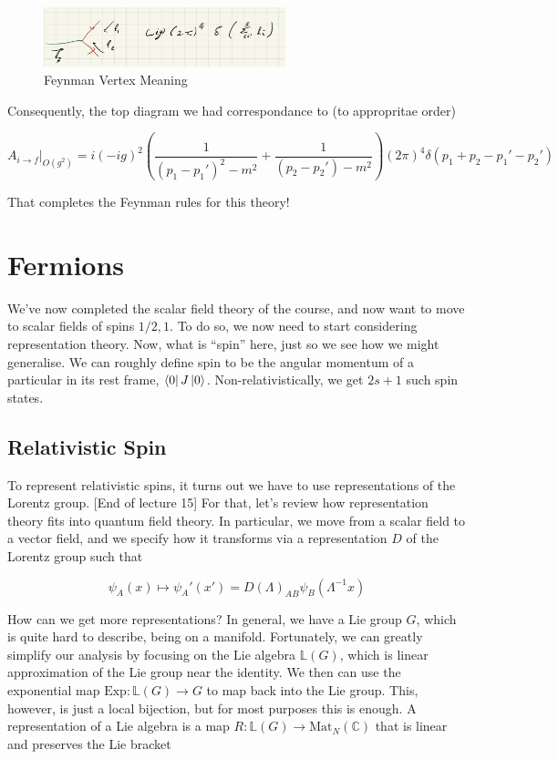 \documentclass{article}
\theoremstyle{definition}
\begin{document}
\begin{figure}[H]
  \centering
  \includegraphics[width=7cm]{res/QFT/feynman_correspondance_2}
  \caption{Feynman Vertex Meaning}
  \label{feynman_correspondance_2}
\end{figure}

Consequently, the top diagram we had correspondance to (to appropritae order)

$$ A_{i \to f} |_{O(g^2)} = i(-ig)^2 \left( \frac{1}{(p_1 - p_1')^2 - m^2} +
  \frac{1}{(p_2 - p_2') - m^2} \right) (2\pi)^4 \delta(p_1 + p_2 - p_1' -
p_2') $$

That completes the Feynman rules for this theory!

\section{Fermions}

We've now completed the scalar field theory of the course, and now want to move
to scalar fields of spins $1/2, 1$. To do so, we now need to start considering
representation theory. Now, what is ``spin'' here, just so we see how we might
generalise. We can roughly define spin to be the angular momentum of a
particular in its rest frame, $\bra{0} J \ket{0}$. Non-relativistically, we get
$2s + 1$ such spin states.

\subsection{Relativistic Spin}

To represent relativistic spins, it turns out we have to use representations of
the Lorentz group. [End of lecture 15] For that, let's review how representation
theory fits into quantum field theory. In particular, we move from a scalar
field to a vector field, and we specify how it transforms via a representation
$D$ of the Lorentz group such that

$$ \psi_A (x) \mapsto \psi_A'(x') = D(\Lambda)_{AB} \psi_B(\Lambda^{-1} x) $$

How can we get more representations? In general, we have a Lie group $G$, which
is quite hard to describe, being on a manifold. Fortunately, we can greatly
simplify our analysis by focusing on the Lie algebra $\mathbb{L}(G)$, which is
linear approximation of the Lie group near the identity. We then can use the
exponential map $\text{Exp} : \mathbb{L}(G) \to G$ to map back into the Lie
group. This, however, is just a local bijection, but for most purposes this is
enough. A representation of a Lie algebra is a map $R : \mathbb{L}(G) \to
\text{Mat}_N (\mathbb{C})$ that is linear and preserves the Lie bracket
\end{document}

